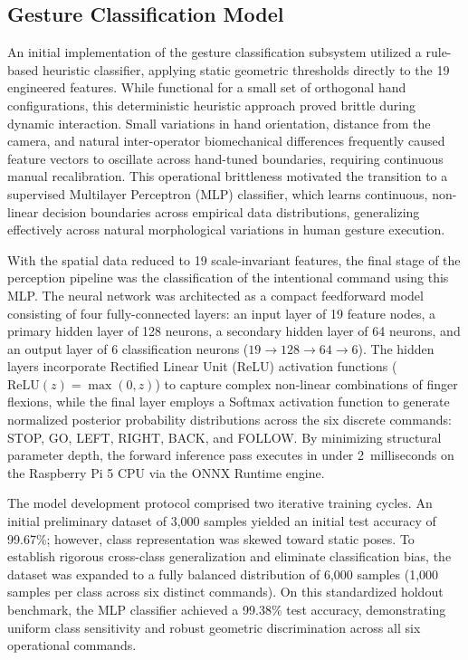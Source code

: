 \subsection{Gesture Classification Model}
\label{sec:gesture_classification_model}
An initial implementation of the gesture classification subsystem utilized a rule-based heuristic classifier, applying static geometric thresholds directly to the 19 engineered features. While functional for a small set of orthogonal hand configurations, this deterministic heuristic approach proved brittle during dynamic interaction. Small variations in hand orientation, distance from the camera, and natural inter-operator biomechanical differences frequently caused feature vectors to oscillate across hand-tuned boundaries, requiring continuous manual recalibration. This operational brittleness motivated the transition to a supervised Multilayer Perceptron (MLP) classifier, which learns continuous, non-linear decision boundaries across empirical data distributions, generalizing effectively across natural morphological variations in human gesture execution.

With the spatial data reduced to 19 scale-invariant features, the final stage of the perception pipeline was the classification of the intentional command using this MLP. The neural network was architected as a compact feedforward model consisting of four fully-connected layers: an input layer of 19 feature nodes, a primary hidden layer of 128 neurons, a secondary hidden layer of 64 neurons, and an output layer of 6 classification neurons ($19 \to 128 \to 64 \to 6$). The hidden layers incorporate Rectified Linear Unit (ReLU) activation functions ($\text{ReLU}(z) = \max(0, z)$) to capture complex non-linear combinations of finger flexions, while the final layer employs a Softmax activation function to generate normalized posterior probability distributions across the six discrete commands: STOP, GO, LEFT, RIGHT, BACK, and FOLLOW. By minimizing structural parameter depth, the forward inference pass executes in under 2~milliseconds on the Raspberry Pi 5 CPU via the ONNX Runtime engine.

The model development protocol comprised two iterative training cycles. An initial preliminary dataset of 3,000 samples yielded an initial test accuracy of 99.67\%; however, class representation was skewed toward static poses. To establish rigorous cross-class generalization and eliminate classification bias, the dataset was expanded to a fully balanced distribution of 6,000 samples (1,000 samples per class across six distinct commands). On this standardized holdout benchmark, the MLP classifier achieved a 99.38\% test accuracy, demonstrating uniform class sensitivity and robust geometric discrimination across all six operational commands.

